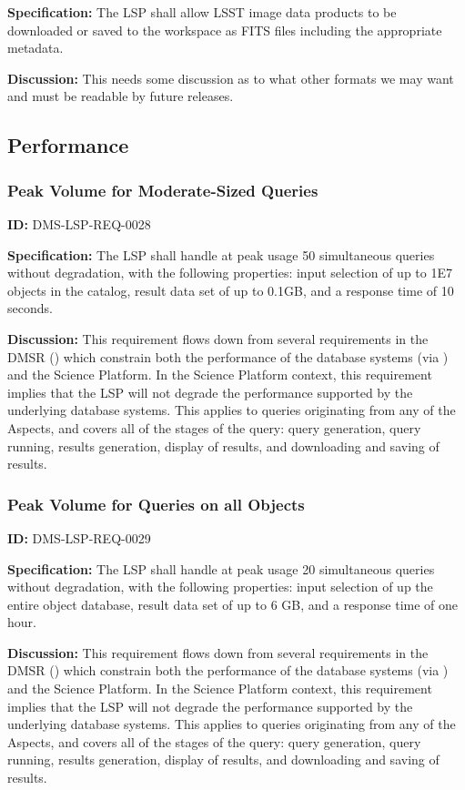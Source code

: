 \documentclass[SE,toc,lsstdraft]{lsstdoc}
\begin{document}
\textbf{Specification:}
The LSP shall allow LSST image data products to be downloaded or saved to the workspace as FITS files including the appropriate metadata.

\textbf{Discussion:}
This needs some discussion as to what other formats we may want and must be readable by future releases.

\subsection{Performance}

\subsubsection{Peak Volume for Moderate-Sized Queries}

\label{DMS-LSP-REQ-0028}
\textbf{ID:} DMS-LSP-REQ-0028

\textbf{Specification:}
The LSP shall handle at peak usage 50 simultaneous queries without degradation, with the following properties: input selection of up to 1E7 objects in the catalog, result data set of up to 0.1GB, and a response time of 10 seconds.

\textbf{Discussion:}
This requirement flows down from several requirements in the DMSR () which constrain both the performance of the database systems (via ) and the Science Platform.  In the Science Platform context, this requirement implies that the LSP will not degrade the performance supported by the underlying database systems.  This applies to queries originating from any of the Aspects, and covers all of the stages of the query: query generation, query running, results generation, display of results, and downloading and saving of results.

\subsubsection{Peak Volume for Queries on all Objects}

\label{DMS-LSP-REQ-0029}
\textbf{ID:} DMS-LSP-REQ-0029

\textbf{Specification:}
The LSP shall handle at peak usage 20 simultaneous queries without degradation, with the following properties: input selection of up the entire object database, result data set of up to 6 GB, and a response time of one hour.

\textbf{Discussion:}
This requirement flows down from several requirements in the DMSR () which constrain both the performance of the database systems (via ) and the Science Platform.  In the Science Platform context, this requirement implies that the LSP will not degrade the performance supported by the underlying database systems.  This applies to queries originating from any of the Aspects, and covers all of the stages of the query: query generation, query running, results generation, display of results, and downloading and saving of results.
\end{document}
